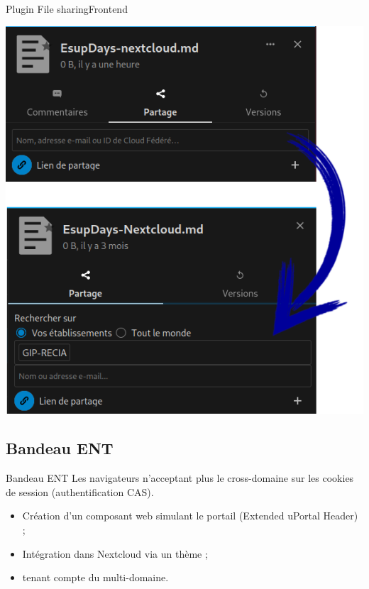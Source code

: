 \begin{frame}[fragile]{Plugin File sharing}{Frontend}

\includegraphics[height=0.75\textheight]{filesharing.png}
\end{frame}

\subsection{Bandeau ENT}
\begin{frame}{Bandeau ENT}
Les navigateurs n'acceptant plus le cross-domaine sur les cookies de session (authentification CAS).
\begin{itemize}
	\item Création d'un composant web simulant le portail (Extended uPortal Header) ;
	\item Intégration dans Nextcloud via un thème ;
	\item tenant compte du multi-domaine.  
\end{itemize}
\end{frame}
